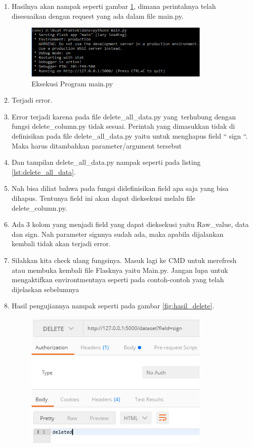 \begin{enumerate}
\item Hasilnya akan nampak seperti gambar \ref{fig:eksekusi_fungsi17}, dimana perintahnya telah disesuaikan dengan request yang ada dalam file main.py.
\begin{figure}[!htbp]
	\centerline{\includegraphics[width=0.85\textwidth]{figures/8/eksekusi_fungsi17.png}}
	\caption{Eksekusi Program main.py}
	\label{fig:eksekusi_fungsi17}
\end{figure}
\item Terjadi error.
\item Error terjadi karena pada file delete\_all\_data.py yang\ terhubung dengan fungsi delete\_column.py tidak sesuai. Perintah yang dimasukkan tidak di definisikan pada file delete\_all\_data.py yaitu untuk menghapus field “ sign “. Maka harus ditambahkan parameter/argument tersebut
\item Dan tampilan delete\_all\_data.py nampak seperti pada listing \ref{lst:delete_all_data}.

\item Nah bisa diliat bahwa pada fungsi didefinisikan field apa saja yang bisa dihapus. Tentunya field ini akan dapat dieksekusi melalu file delete\_column.py.
\item Ada 3 kolom yang menjadi field yang dapat dieksekusi yaitu Raw\_value, data dan sign. Nah parameter signnya sudah ada, maka apabila dijalankan kembali tidak akan terjadi error.
\item Silahkan kita check ulang fungsinya. Masuk lagi ke CMD untuk merefresh atau membuka kembali file Flasknya yaitu Main.py. Jangan lupa untuk mengaktifkan environtmentnya seperti pada contoh-contoh yang telah dijelaskan sebelumnya
\item Hasil pengujiannya nampak seperti pada gambar \ref{fig:hasil_delete}.
\begin{figure}[!htbp]
	\centerline{\includegraphics[width=0.85\textwidth]{figures/8/hasil_delete.png}} 

\end{figure}
\end{enumerate}
